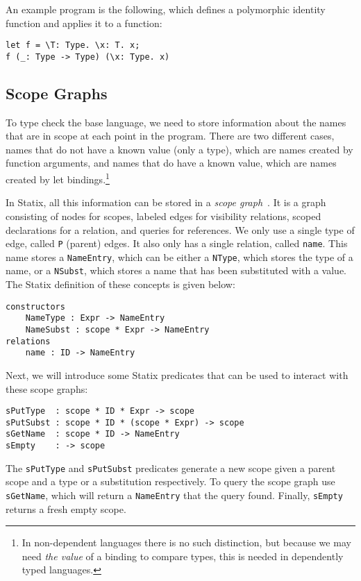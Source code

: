 \documentclass[a4paper,UKenglish,cleveref, autoref, thm-restate]{oasics-v2021}
\begin{document}
An example program is the following, which defines a polymorphic identity function and applies it to a function:

\begin{lstlisting}
let f = \T: Type. \x: T. x;
f (_: Type -> Type) (\x: Type. x)
\end{lstlisting}

\subsection{Scope Graphs}
\label{sec:coc-scopes}

To type check the base language, we need to store information about the names that are in scope at each point in the program. There are two different cases, names that do not have a known value (only a type), which are names created by function arguments, and names that do have a known value, which are names created by let bindings.\footnote{In non-dependent languages there is no such distinction, but because we may need \emph{the value} of a binding to compare types, this is needed in dependently typed languages.}

In Statix, all this information can be stored in a \emph{scope graph}~\cite{scope_graphs}. It is a graph consisting of nodes for scopes, labeled edges for visibility relations, scoped declarations for a relation, and queries for references. We only use a single type of edge, called \verb|P| (parent) edges. It also only has a single relation, called \verb|name|. This name stores a \verb|NameEntry|, which can be either a \verb|NType|, which stores the type of a name, or a \verb|NSubst|, which stores a name that has been substituted with a value. The Statix definition of these concepts is given below: 
\begin{lstlisting}
constructors
    NameType : Expr -> NameEntry
    NameSubst : scope * Expr -> NameEntry
relations
    name : ID -> NameEntry
\end{lstlisting}

Next, we will introduce some Statix predicates that can be used to interact with these scope graphs:

\begin{lstlisting}
sPutType  : scope * ID * Expr -> scope
sPutSubst : scope * ID * (scope * Expr) -> scope
sGetName  : scope * ID -> NameEntry
sEmpty    : -> scope
\end{lstlisting}
The \verb|sPutType| and \verb|sPutSubst| predicates generate a new scope given a parent scope and a type or a substitution respectively. To query the scope graph use \verb|sGetName|, which will return a \verb|NameEntry| that the query found. Finally, \verb|sEmpty| returns a fresh empty scope.
\end{document}
